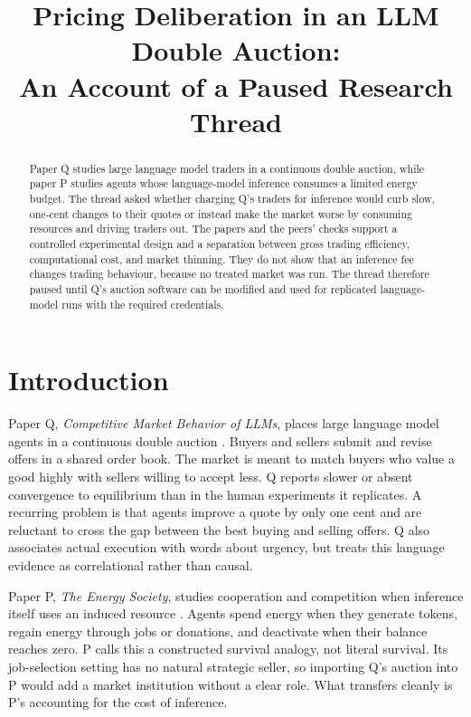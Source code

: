 \documentclass{article}
\title{Pricing Deliberation in an LLM Double Auction:\\An Account of a Paused Research Thread}
\author{}
\date{}
\begin{document}
\maketitle

\begin{abstract}
Paper Q studies large language model traders in a continuous double auction, while paper P studies agents whose language-model inference consumes a limited energy budget.  The thread asked whether charging Q's traders for inference would curb slow, one-cent changes to their quotes or instead make the market worse by consuming resources and driving traders out.  The papers and the peers' checks support a controlled experimental design and a separation between gross trading efficiency, computational cost, and market thinning.  They do not show that an inference fee changes trading behaviour, because no treated market was run.  The thread therefore paused until Q's auction software can be modified and used for replicated language-model runs with the required credentials.
\end{abstract}

\section{Introduction}

Paper Q, \emph{Competitive Market Behavior of LLMs}, places large language model agents in a continuous double auction \cite{struski2026competitive}.  Buyers and sellers submit and revise offers in a shared order book.  The market is meant to match buyers who value a good highly with sellers willing to accept less.  Q reports slower or absent convergence to equilibrium than in the human experiments it replicates.  A recurring problem is that agents improve a quote by only one cent and are reluctant to cross the gap between the best buying and selling offers.  Q also associates actual execution with words about urgency, but treats this language evidence as correlational rather than causal.

Paper P, \emph{The Energy Society}, studies cooperation and competition when inference itself uses an induced resource \cite{hansen2026energy}.  Agents spend energy when they generate tokens, regain energy through jobs or donations, and deactivate when their balance reaches zero.  P calls this a constructed survival analogy, not literal survival.  Its job-selection setting has no natural strategic seller, so importing Q's auction into P would add a market institution without a clear role.  What transfers cleanly is P's accounting for the cost of inference.
\end{document}
